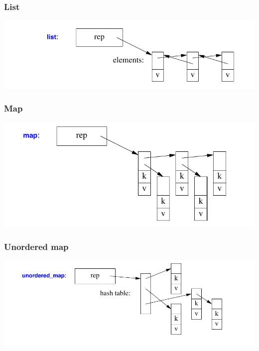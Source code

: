 \begin{frame}
  \frametitle{List}
  \centering
  \includegraphics[width=\textwidth]{img/list.png}
\end{frame}

\begin{frame}
  \frametitle{Map}
  \centering
  \includegraphics[width=\textwidth]{img/map.png}
\end{frame}

\begin{frame}
  \frametitle{Unordered map}
  \centering
  \includegraphics[width=\textwidth]{img/unordered_map.png}
\end{frame}

